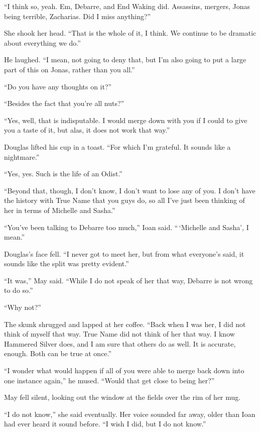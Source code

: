 ``I think so, yeah. Em, Debarre, and End Waking did. Assassins, mergers, Jonas being terrible, Zacharias. Did I miss anything?''

She shook her head. ``That is the whole of it, I think. We continue to be dramatic about everything we do.''

He laughed. ``I mean, not going to deny that, but I'm also going to put a large part of this on Jonas, rather than you all.''

``Do you have any thoughts on it?''

``Besides the fact that you're all nuts?''

``Yes, well, that is indisputable. I would merge down with you if I could to give you a taste of it, but alas, it does not work that way.''

Douglas lifted his cup in a toast. ``For which I'm grateful. It sounds like a nightmare.''

``Yes, yes. Such is the life of an Odist.''

``Beyond that, though, I don't know, I don't want to lose any of you. I don't have the history with True Name that you guys do, so all I've just been thinking of her in terms of Michelle and Sasha.''

``You've been talking to Debarre too much,'' Ioan said. ``\,`Michelle and Sasha', I mean.''

Douglas's face fell. ``I never got to meet her, but from what everyone's said, it sounds like the split was pretty evident.''

``It was,'' May said. ``While I do not speak of her that way, Debarre is not wrong to do so.''

``Why not?''

The skunk shrugged and lapped at her coffee. ``Back when I was her, I did not think of myself that way. True Name did not think of her that way. I know Hammered Silver does, and I am sure that others do as well. It is accurate, enough. Both can be true at once.''

``I wonder what would happen if all of you were able to merge back down into one instance again,'' he mused. ``Would that get close to being her?''

May fell silent, looking out the window at the fields over the rim of her mug.

``I do not know,'' she said eventually. Her voice sounded far away, older than Ioan had ever heard it sound before. ``I wish I did, but I do not know.''
